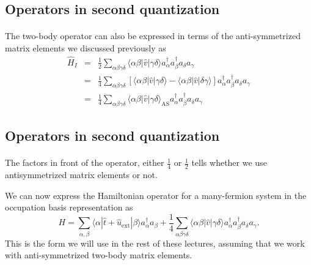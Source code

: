 \documentclass[%
twoside,                 %
final,                   %
10pt]{article}
\begin{document}
\subsection{Operators in second quantization}

\paragraph{}
The two-body operator can also be expressed in terms of the anti-symmetrized matrix elements we discussed previously as
\begin{eqnarray}
	\hat{H}_I &=& \frac{1}{2} \sum_{\alpha\beta\gamma\delta}  \langle \alpha \beta|\hat{v}|\gamma \delta\rangle
		a_\alpha^{\dagger} a_\beta^{\dagger} a_\delta a_\gamma \nonumber \\
	&=& \frac{1}{4} \sum_{\alpha\beta\gamma\delta} \left[ \langle \alpha \beta|\hat{v}|\gamma \delta\rangle -
		\langle \alpha \beta|\hat{v}|\delta\gamma \rangle \right] 
		a_\alpha^{\dagger} a_\beta^{\dagger} a_\delta a_\gamma \nonumber \\
	&=& \frac{1}{4} \sum_{\alpha\beta\gamma\delta} \langle \alpha \beta|\hat{v}|\gamma \delta\rangle_{\mathrm{AS}}
		a_\alpha^{\dagger} a_\beta^{\dagger} a_\delta a_\gamma \label{eq:2-45}
\end{eqnarray}




\subsection{Operators in second quantization}

\paragraph{}
The factors in front of the operator, either  $\frac{1}{4}$ or 
$\frac{1}{2}$ tells whether we use antisymmetrized matrix elements or not. 

We can now express the Hamiltonian operator for a many-fermion system  in the occupation basis representation
as  
\begin{equation}
	H = \sum_{\alpha, \beta} \langle \alpha|\hat{t}+\hat{u}_{\mathrm{ext}}|\beta\rangle a_\alpha^{\dagger} a_\beta + \frac{1}{4} \sum_{\alpha\beta\gamma\delta}
		\langle \alpha \beta|\hat{v}|\gamma \delta\rangle a_\alpha^{\dagger} a_\beta^{\dagger} a_\delta a_\gamma. \label{eq:2-46b}
\end{equation}
This is the form we will use in the rest of these lectures, assuming that we work with anti-symmetrized two-body matrix elements.
\end{document}
